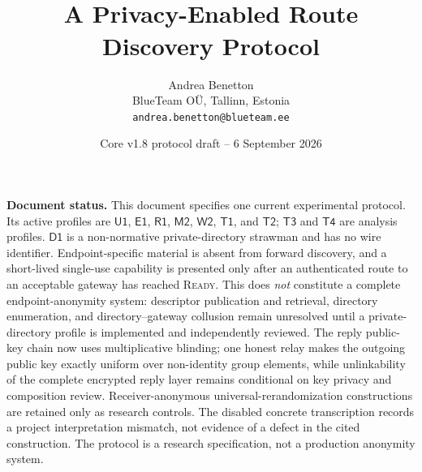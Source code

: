 \documentclass[11pt,oneside]{article}
\title{\vspace{-1.2em}\ProtoName\\[0.25em]\Large A Privacy-Enabled Route Discovery Protocol}
\author{Andrea Benetton\\BlueTeam O\"U, Tallinn, Estonia\\\texttt{andrea.benetton@blueteam.ee}}
\date{Core v1.8 protocol draft -- 6 September 2026}
\newcommand{\Uone}{\ensuremath{\mathsf{U1}}}
\newcommand{\Eone}{\ensuremath{\mathsf{E1}}}
\newcommand{\Rone}{\ensuremath{\mathsf{R1}}}
\newcommand{\Mtwo}{\ensuremath{\mathsf{M2}}}
\newcommand{\Wtwo}{\ensuremath{\mathsf{W2}}}
\newcommand{\Tone}{\ensuremath{\mathsf{T1}}}
\newcommand{\Ttwo}{\ensuremath{\mathsf{T2}}}
\newcommand{\Tthree}{\ensuremath{\mathsf{T3}}}
\newcommand{\Tfour}{\ensuremath{\mathsf{T4}}}
\newcommand{\Done}{\ensuremath{\mathsf{D1}}}
\begin{document}
\maketitle
\vspace{-1.0em}

\begin{statusbox}
\textbf{Document status.} This document specifies one current experimental protocol. Its active profiles are \Uone{}, \Eone{}, \Rone{}, \Mtwo{}, \Wtwo{}, \Tone{}, and \Ttwo{}; \Tthree{} and \Tfour{} are analysis profiles. \Done{} is a non-normative private-directory strawman and has no wire identifier. Endpoint-specific material is absent from forward discovery, and a short-lived single-use capability is presented only after an authenticated route to an acceptable gateway has reached \textsc{Ready}. This does \emph{not} constitute a complete endpoint-anonymity system: descriptor publication and retrieval, directory enumeration, and directory--gateway collusion remain unresolved until a private-directory profile is implemented and independently reviewed. The reply public-key chain now uses multiplicative blinding; one honest relay makes the outgoing public key exactly uniform over non-identity group elements, while unlinkability of the complete encrypted reply layer remains conditional on key privacy and composition review. Receiver-anonymous universal-rerandomization constructions are retained only as research controls. The disabled concrete transcription records a project interpretation mismatch, not evidence of a defect in the cited construction. The protocol is a research specification, not a production anonymity system.
\end{statusbox}
\end{document}
